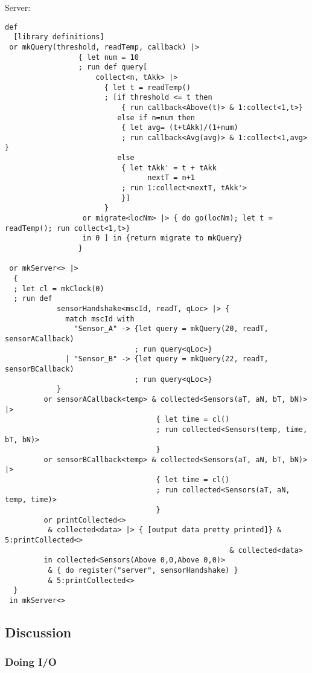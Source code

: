 Server:
\begin{verbatim}
def
  [library definitions]
 or mkQuery(threshold, readTemp, callback) |>
                 { let num = 10
                 ; run def query[
                     collect<n, tAkk> |>
                       { let t = readTemp()
                       ; [if threshold <= t then
                           { run callback<Above(t)> & 1:collect<1,t>}
                          else if n=num then
                           { let avg= (t+tAkk)/(1+num)
                           ; run callback<Avg(avg)> & 1:collect<1,avg> }
                          else
                           { let tAkk' = t + tAkk
                                 nextT = n+1
                           ; run 1:collect<nextT, tAkk'>
                           }]
                       }
                  or migrate<locNm> |> { do go(locNm); let t = readTemp(); run collect<1,t>}
                  in 0 ] in {return migrate to mkQuery}
                 }

 or mkServer<> |>
  {
  ; let cl = mkClock(0)
  ; run def
            sensorHandshake<mscId, readT, qLoc> |> {
              match mscId with
                "Sensor_A" -> {let query = mkQuery(20, readT, sensorACallback)
                              ; run query<qLoc>}
              | "Sensor_B" -> {let query = mkQuery(22, readT, sensorBCallback)
                              ; run query<qLoc>}
            }
         or sensorACallback<temp> & collected<Sensors(aT, aN, bT, bN)> |>
                                   { let time = cl()
                                   ; run collected<Sensors(temp, time, bT, bN)>
                                   }
         or sensorBCallback<temp> & collected<Sensors(aT, aN, bT, bN)> |>
                                   { let time = cl()
                                   ; run collected<Sensors(aT, aN, temp, time)>
                                   }
         or printCollected<>
          & collected<data> |> { [output data pretty printed]} & 5:printCollected<>
                                                    & collected<data>
         in collected<Sensors(Above 0,0,Above 0,0)>
          & { do register("server", sensorHandshake) }
          & 5:printCollected<>
  }
 in mkServer<>
\end{verbatim}
\subsection*{Discussion}

\subsubsection*{Doing I/O}

